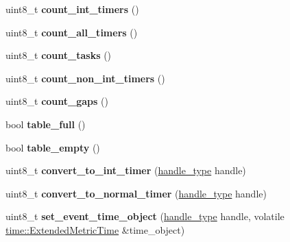 \begin{DoxyCompactItemize}
uint8\+\_\+t {\bfseries count\+\_\+int\+\_\+timers} ()
\item 
\mbox{\label{classfsl_1_1os_1_1scheduler_a7610d3660e0d648aa2baa45015e0e10f}} 
uint8\+\_\+t {\bfseries count\+\_\+all\+\_\+timers} ()
\item 
\mbox{\label{classfsl_1_1os_1_1scheduler_adda13720ba2675f8e15e1b43993d1a27}} 
uint8\+\_\+t {\bfseries count\+\_\+tasks} ()
\item 
\mbox{\label{classfsl_1_1os_1_1scheduler_a933a5e01b2523001831b0b9722598765}} 
uint8\+\_\+t {\bfseries count\+\_\+non\+\_\+int\+\_\+timers} ()
\item 
\mbox{\label{classfsl_1_1os_1_1scheduler_aadd5033633436a4977a3f504bddaea49}} 
uint8\+\_\+t {\bfseries count\+\_\+gaps} ()
\item 
\mbox{\label{classfsl_1_1os_1_1scheduler_a829f91876debd8a4ed5a60ec365f279b}} 
bool {\bfseries table\+\_\+full} ()
\item 
\mbox{\label{classfsl_1_1os_1_1scheduler_ab04e0b3c0a383e1f4241dae53b0f761e}} 
bool {\bfseries table\+\_\+empty} ()
\item 
\mbox{\label{classfsl_1_1os_1_1scheduler_a2ef87c659e859c2b14d89b3ff967caf1}} 
uint8\+\_\+t {\bfseries convert\+\_\+to\+\_\+int\+\_\+timer} (\mbox{\hyperlink{classfsl_1_1lg_1_1range__int}{handle\+\_\+type}} handle)
\item 
\mbox{\label{classfsl_1_1os_1_1scheduler_a44032638f05875ca83599c08b613d921}} 
uint8\+\_\+t {\bfseries convert\+\_\+to\+\_\+normal\+\_\+timer} (\mbox{\hyperlink{classfsl_1_1lg_1_1range__int}{handle\+\_\+type}} handle)
\item 
\mbox{\label{classfsl_1_1os_1_1scheduler_aeeede1308eebb6148fb0847720cbe882}} 
uint8\+\_\+t {\bfseries set\+\_\+event\+\_\+time\+\_\+object} (\mbox{\hyperlink{classfsl_1_1lg_1_1range__int}{handle\+\_\+type}} handle, volatile \mbox{\hyperlink{classtime_1_1_extended_metric_time}{time\+::\+Extended\+Metric\+Time}} \&time\+\_\+object)

\end{DoxyCompactItemize}
